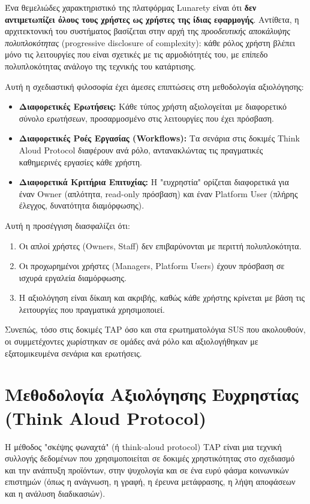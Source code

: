 \documentclass[
	12pt, %
	oneside, %
	greek,
	onehalfspacing, %
	liststotoc, %
	toctotoc, %
	parskip, %
	headsepline, %
]{MastersDoctoralThesis} %
\begin{document}
Ένα θεμελιώδες χαρακτηριστικό της πλατφόρμας Lunarety είναι ότι \textbf{δεν αντιμετωπίζει όλους τους χρήστες ως χρήστες της ίδιας εφαρμογής}. Αντίθετα, η αρχιτεκτονική του συστήματος βασίζεται στην αρχή της \textit{προοδευτικής αποκάλυψης πολυπλοκότητας} (progressive disclosure of complexity): κάθε ρόλος χρήστη βλέπει μόνο τις λειτουργίες που είναι σχετικές με τις αρμοδιότητές του, με επίπεδο πολυπλοκότητας ανάλογο της τεχνικής του κατάρτισης.

Αυτή η σχεδιαστική φιλοσοφία έχει άμεσες επιπτώσεις στη μεθοδολογία αξιολόγησης:

\begin{itemize}
    \item \textbf{Διαφορετικές Ερωτήσεις:} Κάθε τύπος χρήστη αξιολογείται με διαφορετικό σύνολο ερωτήσεων, προσαρμοσμένο στις λειτουργίες που έχει πρόσβαση.
    \item \textbf{Διαφορετικές Ροές Εργασίας (Workflows):} Τα σενάρια στις δοκιμές Think Aloud Protocol διαφέρουν ανά ρόλο, αντανακλώντας τις πραγματικές καθημερινές εργασίες κάθε χρήστη.
    \item \textbf{Διαφορετικά Κριτήρια Επιτυχίας:} Η "ευχρηστία" ορίζεται διαφορετικά για έναν Owner (απλότητα, read-only πρόσβαση) και έναν Platform User (πλήρης έλεγχος, δυνατότητα διαμόρφωσης).
\end{itemize}

Αυτή η προσέγγιση διασφαλίζει ότι:
\begin{enumerate}
    \item Οι απλοί χρήστες (Owners, Staff) δεν επιβαρύνονται με περιττή πολυπλοκότητα.
    \item Οι προχωρημένοι χρήστες (Managers, Platform Users) έχουν πρόσβαση σε ισχυρά εργαλεία διαμόρφωσης.
    \item Η αξιολόγηση είναι δίκαιη και ακριβής, καθώς κάθε χρήστης κρίνεται με βάση τις λειτουργίες που πραγματικά χρησιμοποιεί.
\end{enumerate}

Συνεπώς, τόσο στις δοκιμές TAP όσο και στα ερωτηματολόγια SUS που ακολουθούν, οι συμμετέχοντες χωρίστηκαν σε ομάδες ανά ρόλο και αξιολογήθηκαν με εξατομικευμένα σενάρια και ερωτήσεις.

\section{Μεθοδολογία Αξιολόγησης Ευχρηστίας (Think Aloud Protocol)}
\label{sec:tap-methodology}

Η μέθοδος "σκέψης φωναχτά" (ή think-aloud protocol) TAP είναι μια τεχνική συλλογής δεδομένων που χρησιμοποιείται σε δοκιμές χρηστικότητας στο σχεδιασμό και την ανάπτυξη προϊόντων, στην ψυχολογία και σε ένα ευρύ φάσμα κοινωνικών επιστημών (όπως η ανάγνωση, η γραφή, η έρευνα μετάφρασης, η λήψη αποφάσεων και η ανάλυση διαδικασιών).
\end{document}
